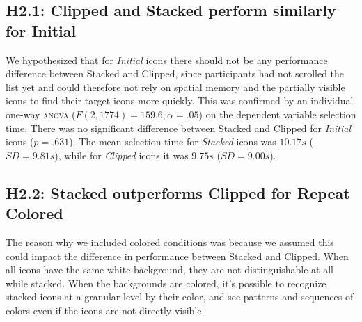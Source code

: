 \documentclass{tufte-book} %
\begin{document}
\subsection{H2.1: Clipped and Stacked perform similarly for Initial}
We hypothesized that for \emph{Initial} icons there should not be any performance difference between Stacked and Clipped, since participants had not scrolled the list yet and could therefore not rely on spatial memory and the partially visible icons to find their target icons more quickly. This was confirmed by an individual one-way \textsc{anova} ($F(2,1774) = 159.6, \alpha = .05$) on the dependent variable selection time. There was no significant difference between Stacked and Clipped for \emph{Initial} icons ($p = .631$). The mean selection time for \emph{Stacked} icons was $10.17 s$ ($SD = 9.81 s$), while for \emph{Clipped} icons it was $9.75 s$ ($SD = 9.00 s$).

\subsection{H2.2: Stacked outperforms Clipped for Repeat Colored}
The reason why we included colored conditions was because we assumed this could impact the difference in performance between Stacked and Clipped. When all icons have the same white background, they are not distinguishable at all while stacked. When the backgrounds are colored, it's possible to recognize stacked icons at a granular level by their color, and see patterns and sequences of colors even if the icons are not directly visible.
\end{document}
